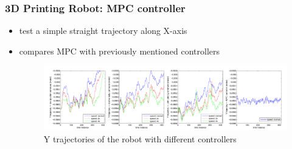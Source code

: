 \documentclass{beamer}
\begin{document}
			\begin{frame}\frametitle{3D Printing Robot: MPC controller}
				\vspace{2mm}
				\begin{itemize}
					\fontsize{8}{4}\selectfont
					\item test a simple straight trajectory along X-axis
					\item compares MPC with previously mentioned controllers
					
%							
					\begin{figure}
						\centering
						\includegraphics[width=0.9\linewidth]{images/trajectory_data_Y.pdf}
						\caption{\fontsize{8}{4}\selectfont Y trajectories of the robot with different controllers}
						\label{fig:trajectory_data_Y}
					\end{figure}

\end{itemize}
\end{frame}
\end{document}
